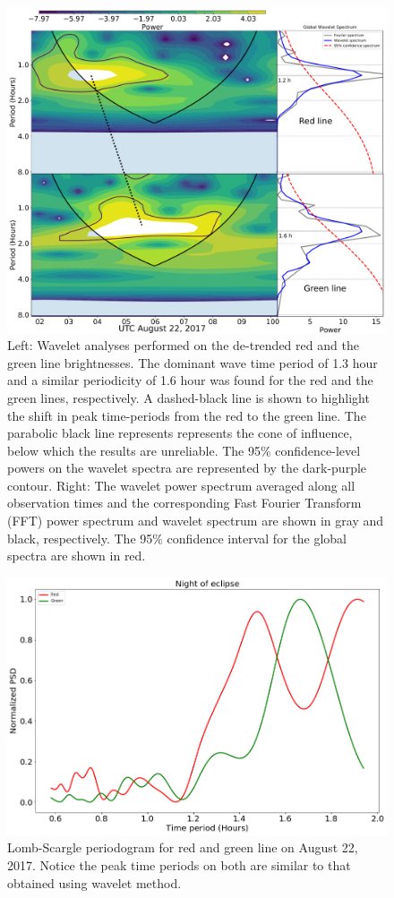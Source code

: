 \documentclass[crop=false,class=mitthesis,oneside,font=12pt]{standalone}
\begin{document}
\begin{figure}[H]
\centering\includegraphics[width=35pc]{wavelet_red_green.pdf}
\caption{Left: Wavelet analyses performed on the de-trended red and the green line brightnesses. The dominant wave time period of 1.3 hour and a similar periodicity of 1.6 hour was found for the red and the green lines, respectively. A dashed-black line is shown to highlight the shift in peak time-periods from the red to the green line. The parabolic black line represents represents the cone of influence, below which the results are unreliable. The 95\% confidence-level powers on the wavelet spectra are represented by the dark-purple contour.  Right: The wavelet power spectrum averaged along all observation times and the corresponding Fast Fourier Transform (FFT) power spectrum and wavelet spectrum are shown in gray and black, respectively. The 95$\%$ confidence interval for the global spectra are shown in red. }
\label{fig:red_green_wv}
\end{figure}
\begin{figure}[H]
	\centering\includegraphics[width=30pc]{lomb.png}
	\caption{Lomb-Scargle periodogram for red and green line on August 22, 2017. Notice the peak time periods on both are similar to that obtained using wavelet method.}
	\label{fig:lomb}
\end{figure}
 
\end{document}
